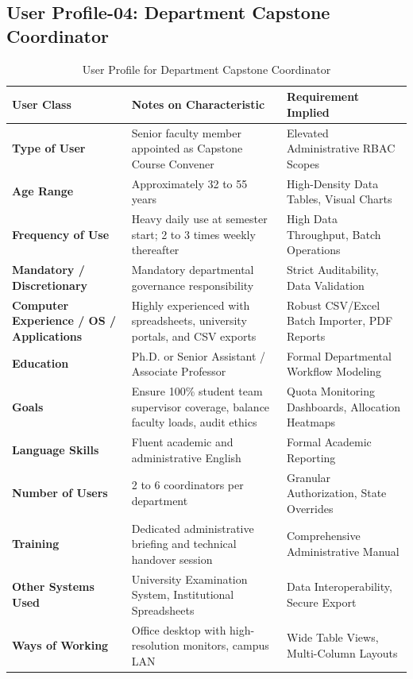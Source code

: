 \subsection{User Profile-04: Department Capstone Coordinator}
\label{subsec:profile_coordinator}

\begin{table}[H]
\centering
\small
\begin{tabularx}{\textwidth}{|l|X|p{4.2cm}|}
\hline
\rowcolor{lightgray!40} \textbf{User Class} & \textbf{Notes on Characteristic} & \textbf{Requirement Implied} \\ \hline
\textbf{Type of User} & Senior faculty member appointed as Capstone Course Convener & Elevated Administrative RBAC Scopes \\ \hline
\textbf{Age Range} & Approximately 32 to 55 years & High-Density Data Tables, Visual Charts \\ \hline
\textbf{Frequency of Use} & Heavy daily use at semester start; 2 to 3 times weekly thereafter & High Data Throughput, Batch Operations \\ \hline
\textbf{Mandatory / Discretionary} & Mandatory departmental governance responsibility & Strict Auditability, Data Validation \\ \hline
\textbf{Computer Experience / OS / Applications} & Highly experienced with spreadsheets, university portals, and CSV exports & Robust CSV/Excel Batch Importer, PDF Reports \\ \hline
\textbf{Education} & Ph.D. or Senior Assistant / Associate Professor & Formal Departmental Workflow Modeling \\ \hline
\textbf{Goals} & Ensure 100\% student team supervisor coverage, balance faculty loads, audit ethics & Quota Monitoring Dashboards, Allocation Heatmaps \\ \hline
\textbf{Language Skills} & Fluent academic and administrative English & Formal Academic Reporting \\ \hline
\textbf{Number of Users} & 2 to 6 coordinators per department & Granular Authorization, State Overrides \\ \hline
\textbf{Training} & Dedicated administrative briefing and technical handover session & Comprehensive Administrative Manual \\ \hline
\textbf{Other Systems Used} & University Examination System, Institutional Spreadsheets & Data Interoperability, Secure Export \\ \hline
\textbf{Ways of Working} & Office desktop with high-resolution monitors, campus LAN & Wide Table Views, Multi-Column Layouts \\ \hline
\end{tabularx}
\caption{User Profile for Department Capstone Coordinator}
\label{tab:user_profile_coordinator}
\end{table}

